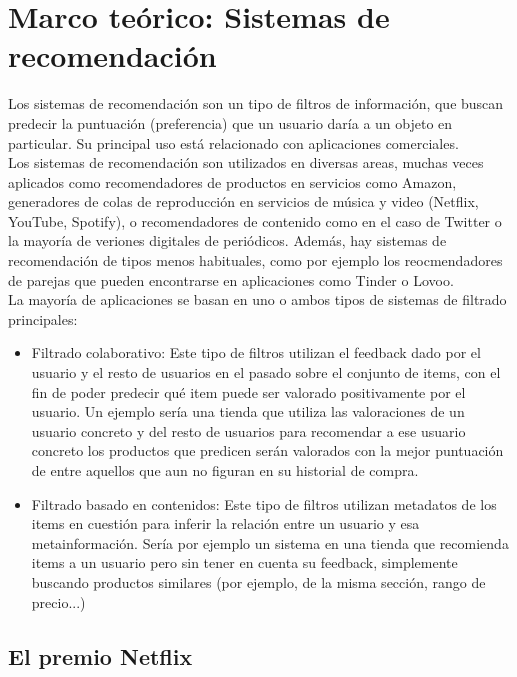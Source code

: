 \chapter{Marco teórico: Sistemas de recomendación}\label{chap:recom}

Los sistemas de recomendación son un tipo de filtros de información, que buscan predecir la puntuación (preferencia) que un usuario daría a un objeto en particular. Su principal uso está relacionado con aplicaciones comerciales.\\

Los sistemas de recomendación son utilizados en diversas areas, muchas veces aplicados como recomendadores de productos en servicios como Amazon, generadores de colas de reproducción en servicios de música y video (Netflix, YouTube, Spotify), o recomendadores de contenido como en el caso de Twitter o la mayoría de veriones digitales de periódicos. Además, hay sistemas de recomendación de tipos menos habituales, como por ejemplo los reocmendadores de parejas que pueden encontrarse en aplicaciones como Tinder o Lovoo.\\

La mayoría de aplicaciones se basan en uno o ambos tipos de sistemas de filtrado principales:

\begin{itemize}
    \item Filtrado colaborativo: Este tipo de filtros utilizan el feedback dado por el usuario y el resto de usuarios en el pasado sobre el conjunto de items, con el fin de poder predecir qué item puede ser valorado positivamente por el usuario. Un ejemplo sería una tienda que utiliza las valoraciones de un usuario concreto y del resto de usuarios para recomendar a ese usuario concreto los productos que predicen serán valorados con la mejor puntuación de entre aquellos que aun no figuran en su historial de compra.
    \item Filtrado basado en contenidos: Este tipo de filtros utilizan metadatos de los items en cuestión para inferir la relación entre un usuario y esa metainformación. Sería por ejemplo un sistema en una tienda que recomienda items a un usuario pero sin tener en cuenta su feedback, simplemente buscando productos similares (por ejemplo, de la misma sección, rango de precio...)
\end{itemize}

\section{El premio Netflix}


